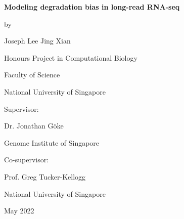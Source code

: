 
\begin{titlepage}
   \begin{center}
       \vspace*{1cm}
       
       \Large
       \textbf{Modeling degradation bias in long-read RNA-seq}
       
       \vspace{1.5cm}
       
       \large
       by\\
       
       \vspace{0.25cm}
       
       Joseph Lee Jing Xian
       
       \vspace{1.5cm}
       
       Honours Project in Computational Biology
       
       \vspace{0.25cm}
       
       Faculty of Science
       
       \vspace{0.25cm}
       
       National University of Singapore
       
       \vspace{1.5cm}
       
       Supervisor:
       
       \vspace{0.25cm}
       
       Dr. Jonathan Göke
       
       \vspace{0.25cm}
       
       Genome Institute of Singapore
       
       \vspace{1.5cm}
       
       Co-supervisor:
       
       \vspace{0.25cm}
       
       Prof. Greg Tucker-Kellogg
       
       \vspace{0.25cm}
       
       National University of Singapore
       
       \vfill
       
       May 2022

   \end{center}
\end{titlepage}